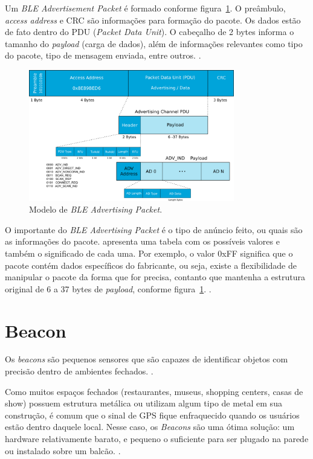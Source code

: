 \documentclass[
		12pt,				%
		openright,			%
		oneside,			%
		a4paper,			%
		chapter=TITLE,		%
		english,			%
		brazil				%
	]{abntex2}
\begin{document}
Um \textit{BLE Advertisement Packet} é formado conforme figura~\ref{fig:ble-adv-packet}. O preâmbulo, \textit{access address} e CRC são informações para formação do pacote. Os dados estão de fato dentro do PDU (\textit{Packet Data Unit}). O cabeçalho de 2 bytes informa o tamanho do \textit{payload} (carga de dados), além de informações relevantes como tipo do pacote, tipo de mensagem enviada, entre outros. \cite{ble-packets}.

\begin{figure}[htb]
	\caption{\label{fig:ble-adv-packet}Modelo de \textit{BLE Advertising Packet}.}
	\begin{center}
		\includegraphics[width=0.8\textwidth]{img/ble-adv-packet.png}
	\end{center}
\end{figure}

O importante do \textit{BLE Advertising Packet} é o tipo de anúncio feito, ou quais são as informações do pacote.  apresenta uma tabela com os possíveis valores e também o significado de cada uma. Por exemplo, o valor 0xFF significa que o pacote contém dados específicos do fabricante, ou seja, existe a flexibilidade de manipular o pacote da forma que for precisa, contanto que mantenha a estrutura original de 6 a 37 bytes de \textit{payload}, conforme figura~\ref{fig:ble-adv-packet}. \cite{ble-packets}.

\section{Beacon}

Os \textit{beacons} são pequenos sensores que são capazes de identificar objetos com precisão dentro de ambientes fechados. \cite{teixeira-beacon}.

\begin{citacao}
Como muitos espaços fechados (restaurantes, museus, shopping centers, casas de show) possuem estrutura metálica ou utilizam algum tipo de metal em sua construção, é comum que o sinal de GPS fique enfraquecido quando os usuários estão dentro daquele local. Nesse caso, os \textit{Beacons} são uma ótima solução: um hardware relativamente barato, e pequeno o suficiente para ser plugado na parede ou instalado sobre um balcão. \cite{teixeira-beacon}.
\end{citacao}
\end{document}
